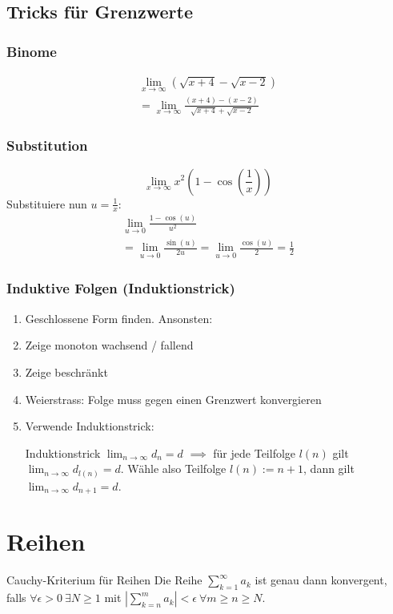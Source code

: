 \documentclass[a4paper,10pt]{article}
\def\limn{\lim_{n\to \infty}}
\def\sumk{\sum_{k=1}^\infty}
\begin{document}
\subsection{Tricks für Grenzwerte}
\subsubsection{Binome}
\begin{multline*}
    \lim_{x\to\infty} (\sqrt{x + 4} - \sqrt{x - 2}) \\
    = \lim_{x\to\infty} \frac{(x+4)-(x-2)}{\sqrt{x+4}+\sqrt{x-2}}
\end{multline*}

\subsubsection{Substitution}
$$\lim_{x\to\infty} x^2 (1-\cos(\frac{1}{x}))$$
Substituiere nun $u = \frac{1}{x}$:
\begin{multline*}
    \lim_{u \to 0} \frac{1 - \cos(u)}{u^2} \\
    = \lim_{u \to 0} \frac{\sin(u)}{2u} = \lim_{u\to 0} \frac{\cos(u)}{2} = \frac{1}{2}
\end{multline*}

\subsubsection{Induktive Folgen (Induktionstrick)}
\begin{enumerate}
  \item Geschlossene Form finden. Ansonsten:
  \item Zeige monoton wachsend / fallend
  \item Zeige beschränkt
  \item Weierstrass: Folge muss gegen einen Grenzwert konvergieren
  \item Verwende Induktionstrick:
  \begin{subbox}{Induktionstrick}
    $\limn{d_n} = d$ $\implies$ für jede Teilfolge $l(n)$ gilt $\limn{d_{l(n)}} = d$. Wähle also Teilfolge $l(n) := n + 1$, dann gilt $\limn{d_{n+1}} = d$.
  \end{subbox}
\end{enumerate}

\section{Reihen}

\begin{mainbox}{Cauchy-Kriterium für Reihen}
Die Reihe $\sumk a_k$ ist genau dann konvergent, falls $\forall \epsilon > 0 \ \exists N \ge 1$ mit $| \sum_{k=n}^m a_k | < \epsilon \ \forall m \ge n \ge N$.
\end{mainbox}
\end{document}
